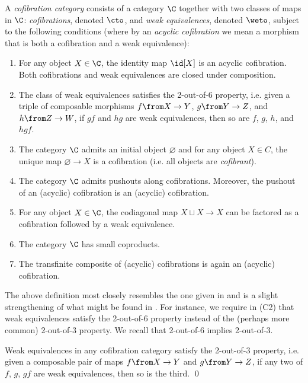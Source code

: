 \begin{defi}\label{cofib-cat-def}
  A \emph{cofibration category} consists of a category $\C$ together with two classes of maps in $\C$: \emph{cofibrations}, denoted $\cto$, and \emph{weak equivalences}, denoted $\weto$, subject to the following conditions (where by an \emph{acyclic cofibration} we mean a morphism that is both a cofibration and a weak equivalence):
  \begin{enumerate}
      \item[(C1)] For any object $X \in \C$, the identity map $\id[X]$ is an acyclic cofibration.
      Both cofibrations and weak equivalences are closed under composition.
      \item[(C2)] The class of weak equivalences satisfies the 2-out-of-6 property, i.e. given a triple of composable morphisms $f \from X \to Y$, $g \from Y \to Z$, and $h \from Z \to W$, if $gf$ and $hg$ are weak equivalences, then so are $f$, $g$, $h$, and $hgf$.
      \item[(C3)] The category $\C$ admits an initial object $\varnothing$ and for any object $X \in C$, the unique map $\varnothing \to X$ is a cofibration (i.e. all objects are \emph{cofibrant}).
      \item[(C4)] The category $\C$ admits pushouts along cofibrations.
      Moreover, the pushout of an (acyclic) cofibration is an (acyclic) cofibration.
      \item[(C5)] For any object $X \in \C$, the codiagonal map $X \sqcup X \to X$ can be factored as a cofibration followed by a weak equivalence.
      \item[(C6)] The category $\C$ has small coproducts.
      \item[(C7)] The transfinite composite of (acyclic) cofibrations is again an (acyclic) cofibration.
  \end{enumerate}
\end{defi}

The above definition most closely resembles the one given in \cite{szumilo:two-models} and is a slight strengthening of what might be found in \cite{brown:abstract-homotopy-theory,baues:algebraic-homotopy}.
For instance, we require in (C2) that weak equivalences satisfy the 2-out-of-6 property instead of the (perhaps more common) 2-out-of-3 property.
We recall that 2-out-of-6 implies 2-out-of-3.

\begin{lemma}
  Weak equivalences in any cofibration category satisfy the 2-out-of-3 property, i.e. given a composable pair of maps $f \from X \to Y$ and $g \from Y \to Z$, if any two of $f$, $g$, $gf$ are weak equivalences, then so is the third. 
  \qed
\end{lemma}

